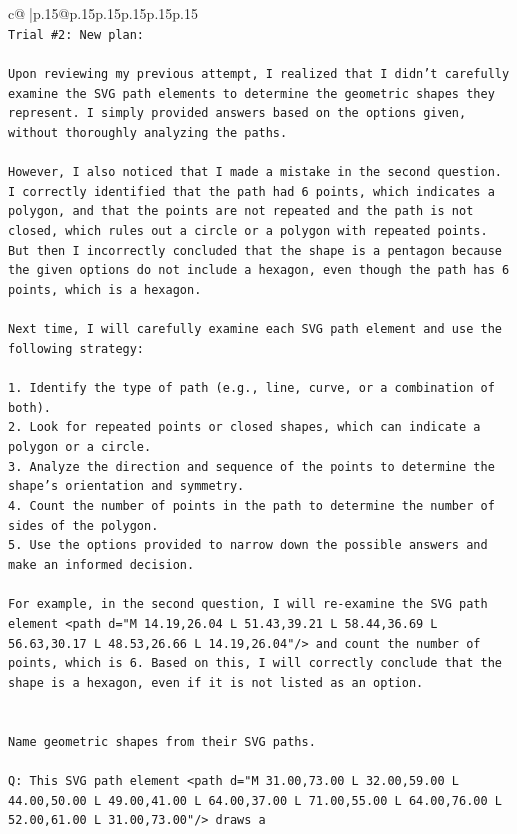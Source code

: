 \documentclass{article}
\begin{document}
{\begin{supertabular}{c@{$\;$}|p{.15\linewidth}@{}p{.15\linewidth}p{.15\linewidth}p{.15\linewidth}p{.15\linewidth}p{.15\linewidth}}
{{{\\ 
\texttt{Trial \#2: New plan: } \\
\\ 
\texttt{Upon reviewing my previous attempt, I realized that I didn't carefully examine the SVG path elements to determine the geometric shapes they represent. I simply provided answers based on the options given, without thoroughly analyzing the paths.} \\
\\ 
\texttt{However, I also noticed that I made a mistake in the second question. I correctly identified that the path had 6 points, which indicates a polygon, and that the points are not repeated and the path is not closed, which rules out a circle or a polygon with repeated points. But then I incorrectly concluded that the shape is a pentagon because the given options do not include a hexagon, even though the path has 6 points, which is a hexagon.} \\
\\ 
\texttt{Next time, I will carefully examine each SVG path element and use the following strategy:} \\
\\ 
\texttt{1. Identify the type of path (e.g., line, curve, or a combination of both).} \\
\texttt{2. Look for repeated points or closed shapes, which can indicate a polygon or a circle.} \\
\texttt{3. Analyze the direction and sequence of the points to determine the shape's orientation and symmetry.} \\
\texttt{4. Count the number of points in the path to determine the number of sides of the polygon.} \\
\texttt{5. Use the options provided to narrow down the possible answers and make an informed decision.} \\
\\ 
\texttt{For example, in the second question, I will re{-}examine the SVG path element <path d="M 14.19,26.04 L 51.43,39.21 L 58.44,36.69 L 56.63,30.17 L 48.53,26.66 L 14.19,26.04"/> and count the number of points, which is 6. Based on this, I will correctly conclude that the shape is a hexagon, even if it is not listed as an option.} \\
\\ 
\\ 
\texttt{Name geometric shapes from their SVG paths.} \\
\\ 
\texttt{Q: This SVG path element <path d="M 31.00,73.00 L 32.00,59.00 L 44.00,50.00 L 49.00,41.00 L 64.00,37.00 L 71.00,55.00 L 64.00,76.00 L 52.00,61.00 L 31.00,73.00"/> draws a} \\
}}}
\end{supertabular}}
\end{document}
